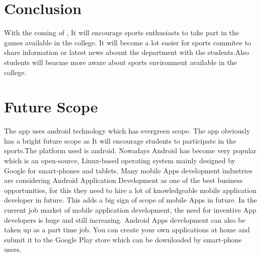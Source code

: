 \section{Conclusion}
With the coming of \appName, It will encourage sports enthusiasts to take part in the games available in the college. It will become a lot easier for sports commitee to share information or latest news abount the department with the students.Also students will beacme more aware about sports environment available in the college. 

\section{Future Scope}
The app uses android technology which has evergreen scope. The app obviously has a bright
future scope as It will encourage students to participate in the sports.The platform used is
android. Nowadays Android has become very popular which is an open-source, Linux-based
operating system mainly designed by Google for smart-phones and tablets.
Many mobile Apps development industries are considering Android Application Development as one of the best business opportunities, for this they need to hire a lot of knowledgeable
mobile application developer in future. This adds a big sign of scope of mobile Apps in future.
In the current job market of mobile application development, the need for inventive App
developers is huge and still increasing. Android Apps development can also be taken up as
a part time job. You can create your own applications at home and submit it to the Google
Play store which can be downloaded by smart-phone users.